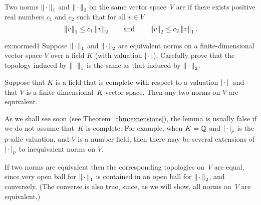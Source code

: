\begin{definition}[Equivalent]
  Two norms $\left\|\,\cdot\,\right\|_1$ and $\left\|\,\cdot\,\right\|_2$ on the same vector space~$V$
  are  if there exists positive real numbers $c_1$ and $c_2$
  such that for all $v\in V$
$$
  \left\|v\right\|_1 \leq c_1 \left\|v\right\|_2
  \qquad\text{and}\qquad
  \left\|v\right\|_2 \leq c_2 \left\|v\right\|_1.
$$
\end{definition}

\begin{exercise}{ex:normed1}
Suppose $\left\|\,\cdot\,\right\|_1$ and $\left\|\,\cdot\,\right\|_2$ are 
equivalent norms on a finite-dimensional vector space
$V$ over a field $K$ (with valuation $\left|\,\cdot\,\right|$). 
Carefully prove that the topology induced by $\left\|\,\cdot\,\right\|_1$
is the same as that induced by $\left\|\,\cdot\,\right\|_2$.
\end{exercise}


\begin{lemma}\label{lem:ext_unique}
Suppose that $K$ is a field that is complete with respect to a valuation
$\left|\,\cdot\,\right|{}$ and that $V$ is a finite dimensional~$K$ vector space.  
Then any two norms on $V$ are equivalent.
\end{lemma}
\begin{remark}
  As we shall see soon (see Theorem~\ref{thm:extensions}), the lemma
  is usually false if we do not assume that~$K$ is complete.  For
  example, when $K=\mathbb{Q}$ and $\left|\,\cdot\,\right|_p$ is the $p$-adic valuation, and
  $V$ is a number field, then there may be several extensions of
  $\left|\,\cdot\,\right|_p$ to inequivalent norms on $V$.
\end{remark}
If two norms are equivalent then the corresponding topologies on~$V$
are equal, since very open ball for $\left\|\,\cdot\,\right\|_1$ is contained in an
open ball for $\left\|\,\cdot\,\right\|_2$, and conversely. (The converse is also
true, since, as we will show, all norms on~$V$ are equivalent.)
